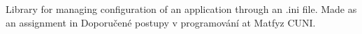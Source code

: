 Library for managing configuration of an application through an .ini file. Made as an assignment in Doporučené postupy v programování at Matfyz C\+U\+NI. 